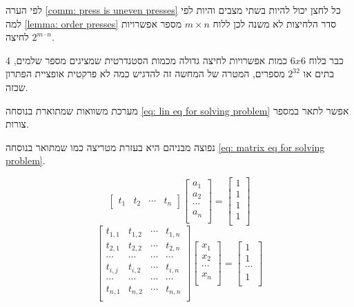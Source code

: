 \documentclass[12pt,leqno]{article}
\begin{document}
לפי הערה 
\ref{comm: press is uneven presses}
כל לחצן יכול להיות בשתי מצבים 
והיות לפי
למה
\ref{lemma: order presses}
סדר הלחיצות לא משנה 
לכן ללוח
$m \times n$
מספר אפשרויות לחיצה 
$2^{m \cdot n}$.

כבר בלוח 
$6x6$
כמות  אפשרויות לחיצה גדולה 
מכמות הסטנדרטית שמציגים מספר שלמים,
4 בתים או 
$2^{32}$
מספרים,
המטרה של המחשה זה להדגיש כמה לא פרקטית אופציית הפתרון שכזה.

מערכת משוואות 
שמתוארת בנוסחה
\ref{eq: lin eq for solving problem}
אפשר לתאר במספר צורות.

נפוצה מבניהם היא
בעזרת מטריצה כמו שמתואר 
בנוסחה 
\ref{eq: matrix eq for solving problem}.

\begin{equation*}
    \begin{bmatrix}
        t_1 & t_2 & \cdots & t_n
    \end{bmatrix}
    \begin{bmatrix}
        a_1 \\
        a_2 \\
        \cdots \\
        a_n \\
    \end{bmatrix}
    =
    \begin{bmatrix}
        1 \\
        1 \\
        1 \\
        1 \\
    \end{bmatrix}
\end{equation*}
\begin{equation}
    \label{eq: matrix eq for solving problem}
    \begin{bmatrix}
        t_{1,1} & t_{1,2} & \cdots & t_{1,n} \\
        t_{2,1} & t_{2,2} & \cdots & t_{2,n} \\
        \cdots & \cdots & \cdots & \cdots\\
        t_{i,j} & t_{i,2} & \cdots & t_{i,n} \\
        \cdots & \cdots & \cdots & \cdots\\
        t_{n,1} & t_{n,2} & \cdots & t_{n,n} \\
    \end{bmatrix}
    \begin{bmatrix}
        x_1 \\
        x_2 \\
        \cdots \\
        x_n \\
    \end{bmatrix}
    = 
    \begin{bmatrix}
        1 \\
        1 \\
        \cdots \\
        1 \\
    \end{bmatrix}
\end{equation}
\end{document}
